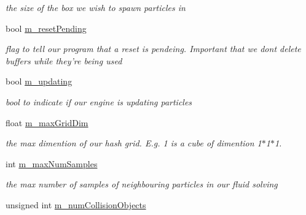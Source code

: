 \begin{DoxyCompactItemize}
\begin{DoxyCompactList}\small\item\em the size of the box we wish to spawn particles in \end{DoxyCompactList}\item 
\hypertarget{class_s_p_h_engine_a9a0447cf722b2762d0deef8ba2207c4f}{bool \hyperlink{class_s_p_h_engine_a9a0447cf722b2762d0deef8ba2207c4f}{m\-\_\-reset\-Pending}}\label{class_s_p_h_engine_a9a0447cf722b2762d0deef8ba2207c4f}

\begin{DoxyCompactList}\small\item\em flag to tell our program that a reset is pendeing. Important that we dont delete buffers while they're being used \end{DoxyCompactList}\item 
\hypertarget{class_s_p_h_engine_a410dece6ca52e90ffa4e133ae870bc19}{bool \hyperlink{class_s_p_h_engine_a410dece6ca52e90ffa4e133ae870bc19}{m\-\_\-updating}}\label{class_s_p_h_engine_a410dece6ca52e90ffa4e133ae870bc19}

\begin{DoxyCompactList}\small\item\em bool to indicate if our engine is updating particles \end{DoxyCompactList}\item 
\hypertarget{class_s_p_h_engine_a68865be6752f47c93a2b193be86be37f}{float \hyperlink{class_s_p_h_engine_a68865be6752f47c93a2b193be86be37f}{m\-\_\-max\-Grid\-Dim}}\label{class_s_p_h_engine_a68865be6752f47c93a2b193be86be37f}

\begin{DoxyCompactList}\small\item\em the max dimention of our hash grid. E.\-g. 1 is a cube of dimention 1$\ast$1$\ast$1. \end{DoxyCompactList}\item 
\hypertarget{class_s_p_h_engine_a8791d887a1c8119b62582a93cdfb98a1}{int \hyperlink{class_s_p_h_engine_a8791d887a1c8119b62582a93cdfb98a1}{m\-\_\-max\-Num\-Samples}}\label{class_s_p_h_engine_a8791d887a1c8119b62582a93cdfb98a1}

\begin{DoxyCompactList}\small\item\em the max number of samples of neighbouring particles in our fluid solving \end{DoxyCompactList}\item 
\hypertarget{class_s_p_h_engine_a71f3956e5e1b50dbb14e979677923864}{unsigned int \hyperlink{class_s_p_h_engine_a71f3956e5e1b50dbb14e979677923864}{m\-\_\-num\-Collision\-Objects}}\label{class_s_p_h_engine_a71f3956e5e1b50dbb14e979677923864}


\end{DoxyCompactItemize}
